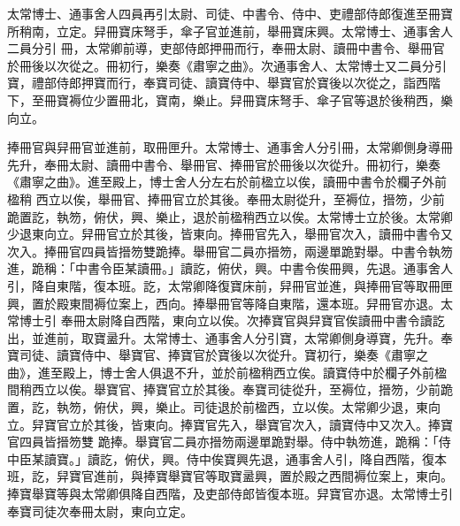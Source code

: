 \begin{pinyinscope}
 太常博士、通事舍人四員再引太尉、司徒、中書令、侍中、吏禮部侍郎復進至冊寶所稍南，立定。舁冊寶床弩手，傘子官並進前，舉冊寶床興。太常博士、通事舍人二員分引
 冊，太常卿前導，吏部侍郎押冊而行，奉冊太尉、讀冊中書令、舉冊官於冊後以次從之。冊初行，樂奏《肅寧之曲》。次通事舍人、太常博士又二員分引寶，禮部侍郎押寶而行，奉寶司徒、讀寶侍中、舉寶官於寶後以次從之，詣西階下，至冊寶褥位少置冊北，寶南，樂止。舁冊寶床弩手、傘子官等退於後稍西，樂向立。



 捧冊官與舁冊官並進前，取冊匣升。太常博士、通事舍人分引冊，太常卿側身導冊先升，奉冊太尉、讀冊中書令、舉冊官、捧冊官於冊後以次從升。冊初行，樂奏《肅寧之曲》。進至殿上，博士舍人分左右於前楹立以俟，讀冊中書令於欄子外前楹稍
 西立以俟，舉冊官、捧冊官立於其後。奉冊太尉從升，至褥位，搢笏，少前跪置訖，執笏，俯伏，興、樂止，退於前楹稍西立以俟。太常博士立於後。太常卿少退東向立。舁冊官立於其後，皆東向。捧冊官先入，舉冊官次入，讀冊中書令又次入。捧冊官四員皆搢笏雙跪捧。舉冊官二員亦搢笏，兩邊單跪對舉。中書令執笏進，跪稱：「中書令臣某讀冊。」讀訖，俯伏，興。中書令俟冊興，先退。通事舍人引，降自東階，復本班。訖，太常卿降復寶床前，舁冊官並進，與捧冊官等取冊匣興，置於殿東間褥位案上，西向。捧舉冊官等降自東階，還本班。舁冊官亦退。太常博士引
 奉冊太尉降自西階，東向立以俟。次捧寶官與舁寶官俟讀冊中書令讀訖出，並進前，取寶盝升。太常博士、通事舍人分引寶，太常卿側身導寶，先升。奉寶司徒、讀寶侍中、舉寶官、捧寶官於寶後以次從升。寶初行，樂奏《肅寧之曲》，進至殿上，博士舍人俱退不升，並於前楹稍西立俟。讀寶侍中於欄子外前楹間稍西立以俟。舉寶官、捧寶官立於其後。奉寶司徒從升，至褥位，搢笏，少前跪置，訖，執笏，俯伏，興，樂止。司徒退於前楹西，立以俟。太常卿少退，東向立。舁寶官立於其後，皆東向。捧寶官先入，舉寶官次入，讀寶侍中又次入。捧寶官四員皆搢笏雙
 跪捧。舉寶官二員亦搢笏兩邊單跪對舉。侍中執笏進，跪稱：「侍中臣某讀寶。」讀訖，俯伏，興。侍中俟寶興先退，通事舍人引，降自西階，復本班，訖，舁寶官進前，與捧寶舉寶官等取寶盝興，置於殿之西間褥位案上，東向。捧寶舉寶等與太常卿俱降自西階，及吏部侍郎皆復本班。舁寶官亦退。太常博士引奉寶司徒次奉冊太尉，東向立定。




\end{pinyinscope}
